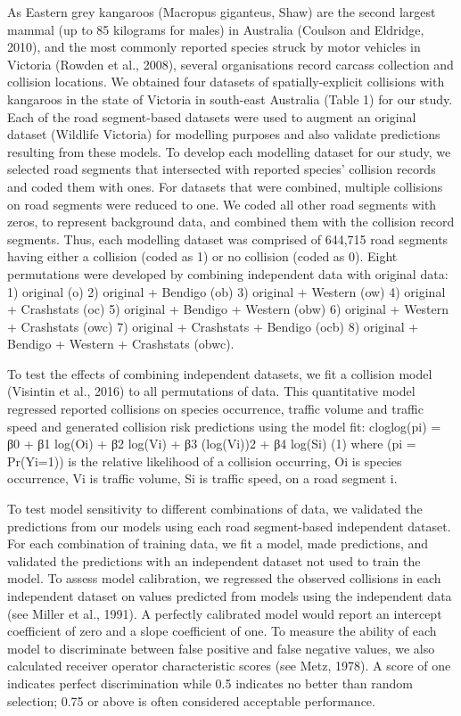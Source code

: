 As Eastern grey kangaroos (Macropus giganteus, Shaw) are the second largest mammal (up to 85 kilograms for males) in Australia (Coulson and Eldridge, 2010), and the most commonly reported species struck by motor vehicles in Victoria (Rowden et al., 2008), several organisations record carcass collection and collision locations. We obtained four datasets of spatially-explicit collisions with kangaroos in the state of Victoria in south-east Australia (Table 1) for our study. Each of the road segment-based datasets were used to augment an original dataset (Wildlife Victoria) for modelling purposes and also validate predictions resulting from these models. To develop each modelling dataset for our study, we selected road segments that intersected with reported species’ collision records and coded them with ones. For datasets that were combined, multiple collisions on road segments were reduced to one. We coded all other road segments with zeros, to represent background data, and combined them with the collision record segments.  Thus, each modelling dataset was comprised of 644,715 road segments having either a collision (coded as 1) or no collision (coded as 0). Eight permutations were developed by combining independent data with original data:
	1) original (o)
	2) original + Bendigo (ob)
	3) original + Western (ow)
	4) original + Crashstats (oc)
	5) original + Bendigo + Western (obw)
	6) original + Western + Crashstats (owc)
	7) original + Crashstats + Bendigo (ocb)
	8) original + Bendigo + Western + Crashstats (obwc).

To test the effects of combining independent datasets, we fit a collision model (Visintin et al., 2016) to all permutations of data.  This quantitative model regressed reported collisions on species occurrence, traffic volume and traffic speed and generated collision risk predictions using the model fit:
cloglog(pi) = β0 + β1 log(Oi) + β2 log(Vi) + β3 (log(Vi))2 + β4 log(Si)		(1)
where (pi = Pr(Yi=1)) is the relative likelihood of a collision occurring, Oi is species occurrence, Vi is traffic volume, Si is traffic speed, on a road segment i.

To test model sensitivity to different combinations of data, we validated the predictions from our models using each road segment-based independent dataset. For each combination of training data, we fit a model, made predictions, and validated the predictions with an independent dataset not used to train the model. To assess model calibration, we regressed the observed collisions in each independent dataset on values predicted from models using the independent data (see Miller et al., 1991). A perfectly calibrated model would report an intercept coefficient of zero and a slope coefficient of one. To measure the ability of each model to discriminate between false positive and false negative values, we also calculated receiver operator characteristic scores (see Metz, 1978). A score of one indicates perfect discrimination while 0.5 indicates no better than random selection; 0.75 or above is often considered acceptable performance.


